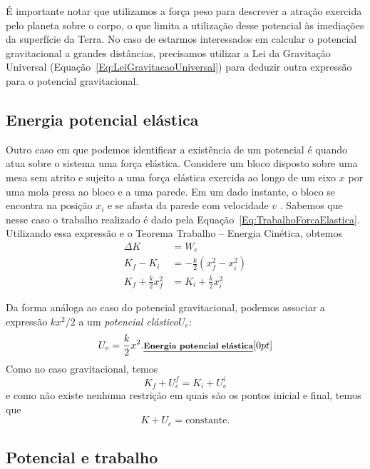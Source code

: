 É importante notar que utilizamos a força peso para descrever a atração exercida pelo planeta sobre o corpo, o que limita a utilização desse potencial às imediações da superfície da Terra. No caso de estarmos interessados em calcular o potencial gravitacional a grandes distâncias, precisamos utilizar a Lei da Gravitação Universal (Equação~\eqref{Eq:LeiGravitacaoUniversal}) para deduzir outra expressão para o potencial gravitacional.

\subsection{Energia potencial elástica}

Outro caso em que podemos identificar a existência de um potencial é quando atua sobre o sistema uma força elástica. Considere um bloco disposto sobre uma mesa sem atrito e sujeito a uma força elástica exercida ao longo de um eixo $x$ por uma mola presa ao bloco e a uma parede. Em um dado instante, o bloco se encontra na posição $x_i$ e se afasta da parede com velocidade $v$ . Sabemos que nesse caso o trabalho realizado é dado pela Equação~\eqref{Eq:TrabalhoForcaElastica}. Utilizando essa expressão e o Teorema Trabalho -- Energia Cinética, obtemos
\begin{align}
  \Delta K &= W_e \\
  K_f - K_i &= -\frac{k}{2}(x_f^2 - x_i^2) \\
  K_f + \frac{k}{2} x_f^2 &= K_i + \frac{k}{2}x_i^2
\end{align}

Da forma análoga ao caso do potencial gravitacional, podemos associar a expressão $kx^2/2$ a um \emph{potencial elástico}$U_e$:
\begin{equation}
  U_e = \frac{k}{2}x^2. \relax{\footnotesize\emph{\textbf{Energia potencial elástica}}}[0pt]
\end{equation}
%
Como no caso gravitacional, temos
\begin{equation}
  K_f + U_e^f = K_i + U_e^i
\end{equation}
%
e como não existe nenhuma restrição em quais são os pontos inicial e final, temos que
\begin{equation}
  K + U_e = \textrm{constante}.
\end{equation}

\subsection{Potencial e trabalho}

